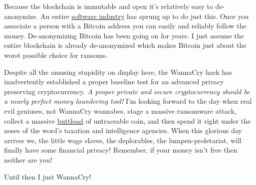 Because the blockchain is immutable and open it's relatively easy to
de-anonymize. An entire
\href{https://www.engadget.com/2016/07/06/startups-seek-to-de-anonymize-bitcoin-to-fight-crime/}{software
industry} has sprung up to do just this. Once you associate a person
with a Bitcoin address you can easily and reliably follow the money.
De-anonymizing Bitcoin has been going on for years. I just assume the
entire blockchain is already de-anonymized which makes Bitcoin just
about the worst possible choice for ransoms.

Despite all the amusing stupidity on display here, the WannaCry hack has
inadvertently established a proper baseline test for an advanced privacy
preserving cryptocurrency. \emph{A proper private and secure
cryptocurrency should be a nearly perfect money laundering tool!} I'm
looking forward to the day when real evil geniuses, not WannaCry
wannabes, stage a massive ransomware attack, collect a massive
\href{http://www.urbandictionary.com/define.php?term=buttload}{buttload} of
untraceable coin, and then spend it right under the noses of the word's
taxation and intelligence agencies. When this glorious day arrives we,
the little wage slaves, the deplorables, the lumpen-proletariat, will
finally have some financial privacy! Remember, if your money isn't free
then neither are you!

Until then I just WannaCry!

%
%
%



%
